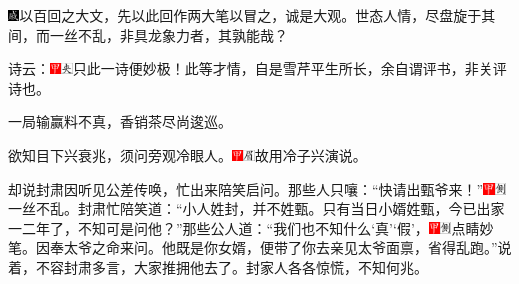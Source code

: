 {\includegraphics[width=3mm]{../Images/00005}{\kaishu 以百回之大文，先以此回作两大笔以冒之，诚是大观。世态人情，尽盘旋于其间，而一丝不乱，非具龙象力者，其孰能哉？}%

诗云：{\includegraphics[width=3mm]{../Images/00002}\includegraphics[width=3mm]{../Images/00012}\footnotesize \kaishu 只此一诗便妙极！此等才情，自是雪芹平生所长，余自谓评书，非关评诗也。}

一局输赢料不真，香销茶尽尚逡巡。

欲知目下兴衰兆，须问旁观冷眼人。{\includegraphics[width=3mm]{../Images/00002}\includegraphics[width=3mm]{../Images/00010}\footnotesize \kaishu 故用冷子兴演说。}

却说封肃因听见公差传唤，忙出来陪笑启问。那些人只嚷：``快请出甄爷来！''{\includegraphics[width=3mm]{../Images/00002}\includegraphics[width=3mm]{../Images/00011}\footnotesize \kaishu 一丝不乱。}封肃忙陪笑道：``小人姓封，并不姓甄。只有当日小婿姓甄，今已出家一二年了，不知可是问他？''那些公人道：``我们也不知什么`真'`假'，{\includegraphics[width=3mm]{../Images/00002}\includegraphics[width=3mm]{../Images/00011}\footnotesize \kaishu 点睛妙笔。}因奉太爷之命来问。他既是你女婿，便带了你去亲见太爷面禀，省得乱跑。''说着，不容封肃多言，大家推拥他去了。封家人各各惊慌，不知何兆。

}
